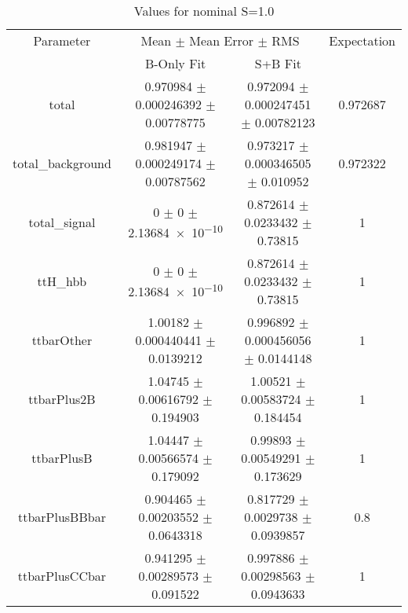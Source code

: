 \begin{table}
\centering
\caption{Values for nominal S=1.0}
\begin{tabular}{cccc}
\toprule
Parameter & \multicolumn{2}{c}{Mean $\pm$ Mean Error $\pm$ RMS} & Expectation\\
 & B-Only Fit & S+B Fit & \\
\midrule
total & \num{0.970984} $\pm$ \num{0.000246392} $\pm$ \num{0.00778775} & \num{0.972094} $\pm$ \num{0.000247451} $\pm$ \num{0.00782123} & \num{0.972687}\\
total\_background & \num{0.981947} $\pm$ \num{0.000249174} $\pm$ \num{0.00787562} & \num{0.973217} $\pm$ \num{0.000346505} $\pm$ \num{0.010952} & \num{0.972322}\\
total\_signal & \num{0} $\pm$ \num{0} $\pm$ \num{2.13684e-10} & \num{0.872614} $\pm$ \num{0.0233432} $\pm$ \num{0.73815} & \num{1}\\
ttH\_hbb & \num{0} $\pm$ \num{0} $\pm$ \num{2.13684e-10} & \num{0.872614} $\pm$ \num{0.0233432} $\pm$ \num{0.73815} & \num{1}\\
ttbarOther & \num{1.00182} $\pm$ \num{0.000440441} $\pm$ \num{0.0139212} & \num{0.996892} $\pm$ \num{0.000456056} $\pm$ \num{0.0144148} & \num{1}\\
ttbarPlus2B & \num{1.04745} $\pm$ \num{0.00616792} $\pm$ \num{0.194903} & \num{1.00521} $\pm$ \num{0.00583724} $\pm$ \num{0.184454} & \num{1}\\
ttbarPlusB & \num{1.04447} $\pm$ \num{0.00566574} $\pm$ \num{0.179092} & \num{0.99893} $\pm$ \num{0.00549291} $\pm$ \num{0.173629} & \num{1}\\
ttbarPlusBBbar & \num{0.904465} $\pm$ \num{0.00203552} $\pm$ \num{0.0643318} & \num{0.817729} $\pm$ \num{0.0029738} $\pm$ \num{0.0939857} & \num{0.8}\\
ttbarPlusCCbar & \num{0.941295} $\pm$ \num{0.00289573} $\pm$ \num{0.091522} & \num{0.997886} $\pm$ \num{0.00298563} $\pm$ \num{0.0943633} & \num{1}\\
\bottomrule
\end{tabular}
\end{table}